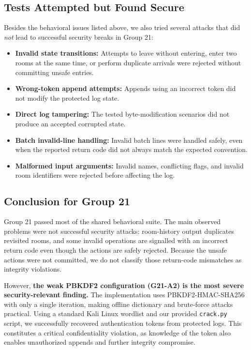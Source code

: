 \documentclass[a4paper, 12pt]{article}
\begin{document}
    \subsection{Tests Attempted but Found Secure}
    Besides the behavioral issues listed above, we also tried several attacks that did \emph{not} lead to successful security breaks in Group 21:
    \begin{itemize}
        \item \textbf{Invalid state transitions:} Attempts to leave without entering, enter two rooms at the same time, or perform duplicate arrivals were rejected without committing unsafe entries.
        \item \textbf{Wrong-token append attempts:} Appends using an incorrect token did not modify the protected log state.
        \item \textbf{Direct log tampering:} The tested byte-modification scenarios did not produce an accepted corrupted state.
        \item \textbf{Batch invalid-line handling:} Invalid batch lines were handled safely, even when the reported return code did not always match the expected convention.
        \item \textbf{Malformed input arguments:} Invalid names, conflicting flags, and invalid room identifiers were rejected before affecting the log.
    \end{itemize}

    \subsection{Conclusion for Group 21}
    Group 21 passed most of the shared behavioral suite. The main observed problems were not successful security attacks: room-history output duplicates revisited rooms, and some invalid operations are signalled with an incorrect return code even though the actions are safely rejected. Because the unsafe actions were not committed, we do not classify those return-code mismatches as integrity violations.

    However, \textbf{the weak PBKDF2 configuration (G21-A2) is the most severe security-relevant finding.} The implementation uses PBKDF2-HMAC-SHA256 with only a single iteration, making offline dictionary and brute-force attacks practical. Using a standard Kali Linux wordlist and our provided \texttt{crack.py} script, we successfully recovered authentication tokens from protected logs. This constitutes a critical confidentiality violation, as knowledge of the token also enables unauthorized appends and further integrity compromise.
\end{document}
